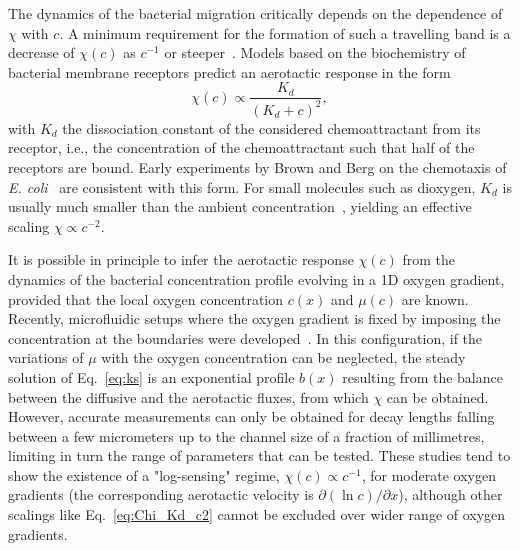 \documentclass[aps,a4paper,twocolumn,10pt,pre,showpacs]{revtex4-2}
\begin{document}
The dynamics of the bacterial migration critically depends on the dependence of $\chi$ with $c$. A minimum requirement for the formation of such a travelling band is a decrease of $\chi(c)$ as $c^{-1}$ or steeper~\cite{keller1971traveling}. Models based on the biochemistry of bacterial membrane receptors predict an aerotactic response in the form~\cite{lapidus1976model,rivero1989transport}
\begin{equation}
\label{eq:Chi_Kd_c2}
\chi(c) \propto \dfrac{K_d}{(K_d+c)^2},
\end{equation}
with $K_d$ the dissociation constant of the considered chemoattractant from its receptor, i.e., the concentration of the chemoattractant such that half of the receptors are bound. Early experiments by Brown and Berg on the chemotaxis of \emph{E. coli}~\cite{brown1974temporal} are consistent with this form. For small molecules such as dioxygen, $K_d$ is usually much smaller than the ambient concentration~\cite{shioi1987oxygen}, yielding an effective scaling $\chi \propto c^{-2}$.

It is possible in principle to infer the aerotactic response $\chi(c)$ from the dynamics of the bacterial concentration profile evolving in a 1D oxygen gradient, provided that the local oxygen concentration $c(x)$ and $\mu(c)$ are known. Recently, microfluidic setups where the oxygen gradient is fixed by imposing the concentration at the boundaries were developed~\cite{kalinin2009,zhuang2014analytical,kirkegaard_2016,menolascina2017logarithmic,ahmed2010microfluidics}. In this configuration, if the variations of $\mu$ with the oxygen concentration can be neglected, the steady solution of Eq.~\eqref{eq:ks} is an exponential profile $b(x)$ resulting from the balance between the diffusive and the aerotactic fluxes, from which $\chi$ can be obtained. However, accurate measurements can only be obtained for decay lengths falling between a few micrometers up to the channel size of a fraction of millimetres, limiting in turn the range of parameters that can be tested. These studies tend to show the existence of a "log-sensing" regime, $\chi(c) \propto c^{-1}$, for moderate oxygen gradients (the corresponding aerotactic velocity is $\partial(\ln c)/\partial x$), although other scalings like Eq.~\eqref{eq:Chi_Kd_c2} cannot be excluded over wider range of oxygen gradients.
\end{document}
